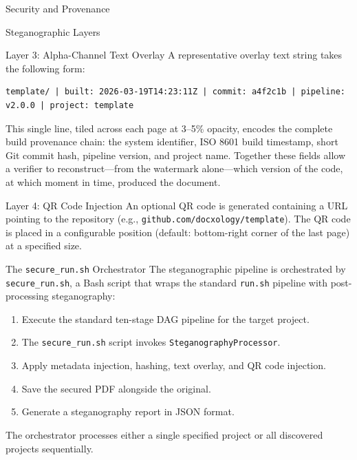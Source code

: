 \documentclass[
  ignorenonframetext,
]{beamer}
\providecommand{\tightlist}{%
  \setlength{\itemsep}{0pt}\setlength{\parskip}{0pt}}
\begin{document}
\begin{frame}[fragile]{Security and Provenance}
\begin{block}{Steganographic Layers}
\begin{block}{Layer 3: Alpha-Channel Text Overlay}
A representative overlay text string takes the following form:

\begin{verbatim}
template/ | built: 2026-03-19T14:23:11Z | commit: a4f2c1b | pipeline: v2.0.0 | project: template
\end{verbatim}

This single line, tiled across each page at 3--5\% opacity, encodes the
complete build provenance chain: the system identifier, ISO 8601 build
timestamp, short Git commit hash, pipeline version, and project name.
Together these fields allow a verifier to reconstruct---from the
watermark alone---which version of the code, at which moment in time,
produced the document.
\end{block}

\begin{block}{Layer 4: QR Code Injection}
\protect{}\label{layer-4-qr-code-injection}
An optional QR code is generated containing a URL pointing to the
repository (e.g., \texttt{github.com/docxology/template}). The QR code
is placed in a configurable position (default: bottom-right corner of
the last page) at a specified size.
\end{block}
\end{block}

\begin{block}{The \texttt{secure\_run.sh} Orchestrator}
\protect{}\label{the-secure_run.sh-orchestrator}
The steganographic pipeline is orchestrated by \texttt{secure\_run.sh},
a Bash script that wraps the standard \texttt{run.sh} pipeline with
post-processing steganography:

\begin{enumerate}
\tightlist
\item
  Execute the standard ten-stage DAG pipeline for the target project.
\item
  The \texttt{secure\_run.sh} script invokes
  \texttt{SteganographyProcessor}.
\item
  Apply metadata injection, hashing, text overlay, and QR code
  injection.
\item
  Save the secured PDF alongside the original.
\item
  Generate a steganography report in JSON format.
\end{enumerate}

The orchestrator processes either a single specified project or all
discovered projects sequentially.
\end{block}


\end{frame}
\end{document}
